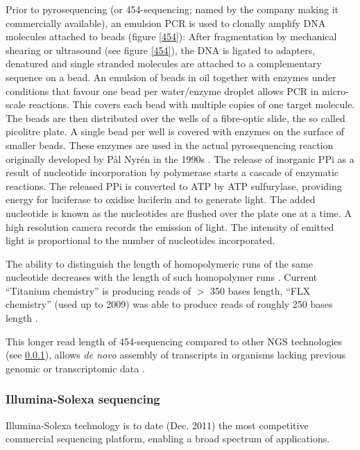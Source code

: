 Prior to pyrosequencing (or 454-sequencing; named by the company
making it commercially available), an emulsion PCR is used to clonally
amplify DNA molecules attached to beads (figure \ref{454}): After
fragmentation by mechanical shearing or ultrasound \cite{pmid20298868}
(see figure \ref{454}), the DNA is ligated to adapters, denatured and
single stranded molecules are attached to a complementary sequence on
a bead. An emulsion of beads in oil together with enzymes under
conditions that favour one bead per water/enzyme droplet allows PCR in
micro-scale reactions. This covers each bead with multiple copies of
one target molecule. The beads are then distributed over the wells of
a fibre-optic slide, the so called picolitre plate. A single bead per
well is covered with enzymes on the surface of smaller beads. These
enzymes are used in the actual pyrosequencing reaction originally
developed by P\r{a}l Nyr\'{e}n in the 1990s \cite{pmid17185753}. The
release of inorganic PPi as a result of nucleotide incorporation by
polymerase starts a cascade of enzymatic reactions. The released PPi
is converted to ATP by ATP sulfurylase, providing energy for
luciferase to oxidise luciferin and to generate light. The added
nucleotide is known as the nucleotides are flushed over the plate one
at a time. A high resolution camera records the emission of light. The
intensity of emitted light is proportional to the number of
nucleotides incorporated.

The ability to distinguish the length of homopolymeric runs of the
same nucleotide decreases with the length of such homopolymer runs
\cite{pmid21685085}. Current ``Titanium chemistry'' is producing reads
of $>$ 350 bases length, ``FLX chemistry'' (used up to 2009) was able
to produce reads of roughly 250 bases length \cite{pmid21514329}.

This longer read length of 454-sequencing \cite{pmid16056220} compared
to other NGS technologies (see \ref{sec:ill-seq}), allows \textit{de
  novo} assembly of transcripts in organisms lacking previous genomic
or transcriptomic data \cite{pmid20950480}.

\subsubsection{Illumina-Solexa sequencing}
\label{sec:ill-seq}

Illumina-Solexa technology is to date (Dec. 2011) the most competitive
commercial sequencing platform, enabling a broad spectrum of
applications.

